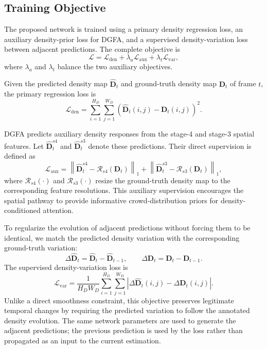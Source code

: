 \documentclass[lettersize,journal]{IEEEtran}
\begin{document}
\subsection{Training Objective}
\label{ls}
The proposed network is trained using a primary density regression loss, an auxiliary density-prior loss for DGFA, and a supervised density-variation loss between adjacent predictions. The complete objective is
\begin{equation}
\mathcal L
=
\mathcal L_{\mathrm{den}}
+
\lambda_a\mathcal L_{\mathrm{aux}}
+
\lambda_t\mathcal L_{\mathrm{var}},
\label{eq:total_loss}
\end{equation}
where $\lambda_a$ and $\lambda_t$ balance the two auxiliary objectives.

Given the predicted density map $\hat{\mathbf D}_t$ and ground-truth density map $\mathbf D_t$ of frame $t$, the primary regression loss is
\begin{equation}
\mathcal L_{\mathrm{den}}
=
\sum_{i=1}^{H_D}\sum_{j=1}^{W_D}
\left(
\hat{\mathbf D}_t(i,j)-\mathbf D_t(i,j)
\right)^2.
\label{eq:density_loss}
\end{equation}

DGFA predicts auxiliary density responses from the stage-4 and stage-3 spatial features. Let $\hat{\mathbf D}_{t}^{s4}$ and $\hat{\mathbf D}_{t}^{s3}$ denote these predictions. Their direct supervision is defined as
\begin{equation}
\mathcal L_{\mathrm{aux}}
=
\left\|
\hat{\mathbf D}_{t}^{s4}-\mathcal R_{s4}(\mathbf D_t)
\right\|_1
+
\left\|
\hat{\mathbf D}_{t}^{s3}-\mathcal R_{s3}(\mathbf D_t)
\right\|_1,
\label{eq:aux_loss}
\end{equation}
where $\mathcal R_{s4}(\cdot)$ and $\mathcal R_{s3}(\cdot)$ resize the ground-truth density map to the corresponding feature resolutions. This auxiliary supervision encourages the spatial pathway to provide informative crowd-distribution priors for density-conditioned attention.

To regularize the evolution of adjacent predictions without forcing them to be identical, we match the predicted density variation with the corresponding ground-truth variation:
\begin{equation}
\Delta\hat{\mathbf D}_t
=
\hat{\mathbf D}_t-\hat{\mathbf D}_{t-1},
\qquad
\Delta\mathbf D_t
=
\mathbf D_t-\mathbf D_{t-1}.
\end{equation}
The supervised density-variation loss is
\begin{equation}
\mathcal L_{\mathrm{var}}
=
\frac{1}{H_DW_D}
\sum_{i=1}^{H_D}\sum_{j=1}^{W_D}
\left|
\Delta\hat{\mathbf D}_t(i,j)-\Delta\mathbf D_t(i,j)
\right|.
\label{eq:variation_loss}
\end{equation}
Unlike a direct smoothness constraint, this objective preserves legitimate temporal changes by requiring the predicted variation to follow the annotated density evolution. The same network parameters are used to generate the adjacent predictions; the previous prediction is used by the loss rather than propagated as an input to the current estimation.
\end{document}
